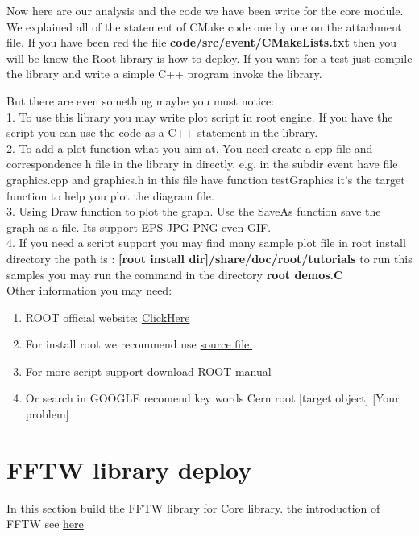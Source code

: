 \documentclass[fleqn,10pt]{SelfArx} %
\begin{document}
\begin{CJK*}{UTF8}{gbsn}
Now here are our analysis and the code we have been write for the core module.
We explained all of the statement of CMake code one by one on the attachment file.
If you have been red the file \textbf{code/src/event/CMakeLists.txt} then you will be know the 
Root library is how to deploy. If you want for a test just compile the library and write a simple C++ program 
invoke the library.

But there are even something maybe you must notice:\\
1. To use this library you may write plot script in root engine. If you have the script you can use the code as a C++ statement in the library.\\
2. To add a plot function what you aim at. You need create a cpp file and correspondence h file in the library in directly. e.g.  in the subdir 
event have file graphics.cpp and graphics.h in this file have function testGraphics it's the target function to help you plot the diagram file.\\
3. Using Draw function to plot the graph. Use the SaveAs function save the graph as a file. Its support EPS JPG PNG even GIF.\\
4. If you need a script support you may find many sample plot file in root install directory the path is : \textbf{[root install dir]/share/doc/root/tutorials}
to run this samples you may run the command in the directory \textbf{root demos.C}
\\

Other information you may need:
\begin{enumerate}[noitemsep] %
\item ROOT official website: \href{http://root.cern.ch/drupal/}{ClickHere}
\item For install root we recommend use \href{http://root.cern.ch/drupal/content/downloading-root}{source file.}
\item For more script support download \href{http://root.cern.ch/download/doc/ROOTUsersGuide.pdf}{ROOT manual}
\item Or search in GOOGLE recomend key words Cern root [target object] [Your problem]
\end{enumerate}


\section{FFTW library deploy}

In this section build the FFTW library for Core library. the introduction of FFTW see \href{http://www.fftw.org/}{here}


\end{CJK*}
\end{document}
